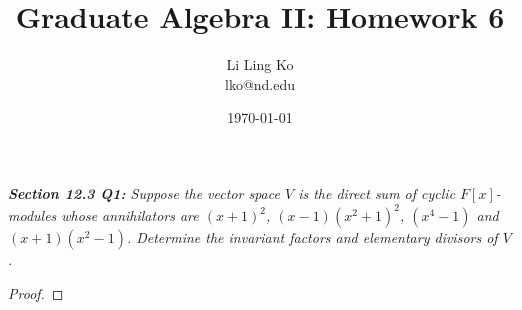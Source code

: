 \documentclass{article}
\begin{document}
\title{Graduate Algebra II: Homework 6}
\author{Li Ling Ko\\ lko@nd.edu}
\date{\today}
\maketitle

\it \textbf{Section 12.3 Q1:} Suppose the vector space $V$ is the direct
  sum of cyclic $F[x]$-modules whose annihilators are $(x+1)^2$,
  $(x-1)(x^2+1)^2$, $(x^4-1)$ and $(x+1)(x^2-1)$. Determine the invariant
  factors and elementary divisors of $V$.

  \begin{proof}
  \end{proof}
\end{document}
